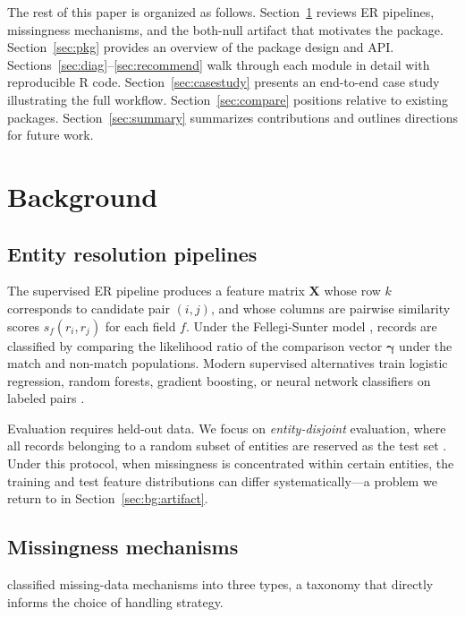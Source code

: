 \documentclass[a4paper]{article}
\begin{document}
\begin{article}
The rest of this paper is organized as follows. Section~\ref{sec:bg}
reviews ER pipelines, missingness mechanisms, and the
both-null artifact that motivates the package. Section~\ref{sec:pkg}
provides an overview of the  package design and API.
Sections~\ref{sec:diag}--\ref{sec:recommend} walk through each module
in detail with reproducible R code.  Section~\ref{sec:casestudy}
presents an end-to-end case study illustrating the full workflow.
Section~\ref{sec:compare} positions  relative to existing
packages.  Section~\ref{sec:summary} summarizes contributions and
outlines directions for future work.

\section{Background}
\label{sec:bg}

\subsection{Entity resolution pipelines}

The supervised ER pipeline produces a feature matrix $\mathbf{X}$ whose
row $k$ corresponds to candidate pair $(i, j)$, and whose columns
are pairwise similarity scores $s_f(r_i, r_j)$ for each field $f$.
Under the Fellegi-Sunter model \citep{FellegiSunter1969}, records are
classified by comparing the likelihood ratio of the comparison vector
$\boldsymbol{\gamma}$ under the match and non-match populations.
Modern supervised alternatives train logistic regression, random
forests, gradient boosting, or neural network classifiers on labeled
pairs \citep{Christophides2020, Mudgal2018}.

Evaluation requires held-out data.  We focus on
\emph{entity-disjoint} evaluation, where all records belonging to a
random subset of entities are reserved as the test set
\citep{Murray2016}.  Under this protocol, when missingness is
concentrated within certain entities, the training and test feature
distributions can differ systematically---a problem we return to in
Section~\ref{sec:bg:artifact}.

\subsection{Missingness mechanisms}

\citet{Rubin1976} classified missing-data mechanisms into three types,
a taxonomy that directly informs the choice of handling strategy.


\end{article}
\end{document}
